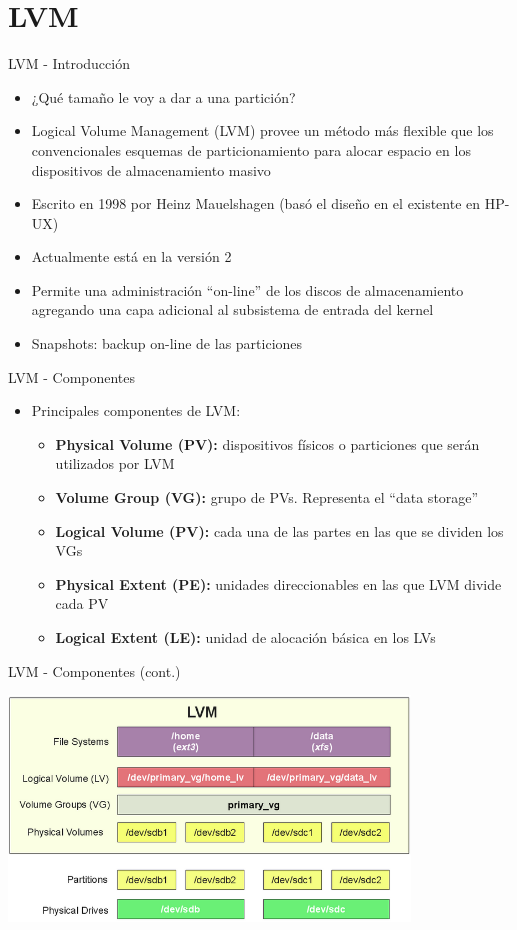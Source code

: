 \section{LVM}

\begin{frame}{LVM - Introducción}
  \begin{itemize}
   \item ¿Qué tamaño le voy a dar a una partición?
   \item Logical Volume Management (LVM) provee un método más flexible que los convencionales esquemas
     de particionamiento para alocar espacio en los dispositivos de almacenamiento masivo 
   \item Escrito en 1998 por Heinz Mauelshagen (basó el diseño en el existente en HP-UX)
   \item Actualmente está en la versión 2
   \item Permite una administración ``on-line'' de los discos de almacenamiento agregando una capa adicional
     al subsistema de entrada del kernel
   \item Snapshots: backup on-line de las particiones  
  \end{itemize}
\end{frame}

\begin{frame}{LVM - Componentes}
 \begin{itemize}
  \item Principales componentes de LVM:
  \begin{itemize}
   \item {\bf Physical Volume (PV):} dispositivos físicos o particiones que serán utilizados por LVM
   \item {\bf Volume Group (VG):} grupo de PVs. Representa el ``data storage'' 
   \item {\bf Logical Volume (PV):} cada una de las partes en las que se dividen los VGs
   \item {\bf Physical Extent (PE):} unidades direccionables en las que LVM divide cada PV
   \item {\bf Logical Extent (LE):} unidad de alocación básica en los LVs
  \end{itemize} 
 \end{itemize}
\end{frame}

\begin{frame}{LVM - Componentes (cont.)}
 \begin{center}
  \includegraphics[width=0.8\textwidth]{images/lvm3.png}
 \end{center}
\end{frame}

